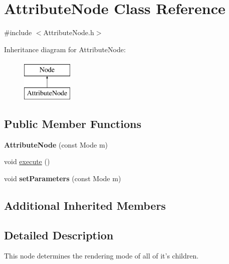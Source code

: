\hypertarget{classAttributeNode}{\section{Attribute\-Node Class Reference}
\label{classAttributeNode}
}


{\ttfamily \#include $<$Attribute\-Node.\-h$>$}

Inheritance diagram for Attribute\-Node\-:\begin{figure}[H]
\begin{center}
\leavevmode
\includegraphics[height=2.000000cm]{classAttributeNode}
\end{center}
\end{figure}
\subsection*{Public Member Functions}
\begin{DoxyCompactItemize}
\item 
\hypertarget{classAttributeNode_a77f9865bfac60b16c51c046c2320935a}{{\bfseries Attribute\-Node} (const Mode m)}\label{classAttributeNode_a77f9865bfac60b16c51c046c2320935a}

\item 
void \hyperlink{classAttributeNode_ad6fb6f07dc9728e066c769c35c321f25}{execute} ()
\item 
\hypertarget{classAttributeNode_a740c689f2c62400b83cbd8b70fc9117d}{void {\bfseries set\-Parameters} (const Mode m)}\label{classAttributeNode_a740c689f2c62400b83cbd8b70fc9117d}

\end{DoxyCompactItemize}
\subsection*{Additional Inherited Members}


\subsection{Detailed Description}
This node determines the rendering mode of all of it's children. 

